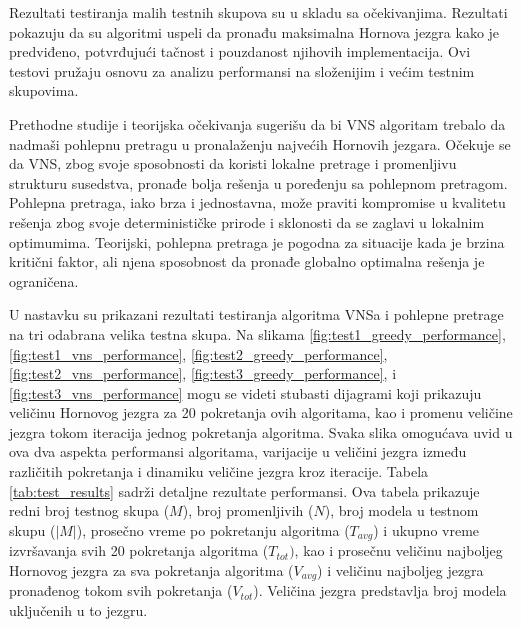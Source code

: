 \documentclass[12pt,oneside]{memoir}
\begin{document}
Rezultati testiranja malih testnih skupova su u skladu sa očekivanjima. Rezultati pokazuju da su algoritmi uspeli da pronađu maksimalna Hornova jezgra kako je predviđeno, potvrđujući tačnost i pouzdanost njihovih implementacija. Ovi testovi pružaju osnovu za analizu performansi na složenijim i većim testnim skupovima.

Prethodne studije i teorijska očekivanja sugerišu da bi VNS algoritam trebalo da nadmaši pohlepnu pretragu u pronalaženju najvećih Hornovih jezgara. Očekuje se da VNS, zbog svoje sposobnosti da koristi lokalne pretrage i promenljivu strukturu susedstva, pronađe bolja rešenja u poređenju sa pohlepnom pretragom. Pohlepna pretraga, iako brza i jednostavna, može praviti kompromise u kvalitetu rešenja zbog svoje determinističke prirode i sklonosti da se zaglavi u lokalnim optimumima. Teorijski, pohlepna pretraga je pogodna za situacije kada je brzina kritični faktor, ali njena sposobnost da pronađe globalno optimalna rešenja je ograničena.

U nastavku su prikazani rezultati testiranja algoritma VNSa i pohlepne pretrage na tri odabrana velika testna skupa. Na slikama \ref{fig:test1_greedy_performance}, \ref{fig:test1_vns_performance}, \ref{fig:test2_greedy_performance}, \ref{fig:test2_vns_performance}, \ref{fig:test3_greedy_performance}, i \ref{fig:test3_vns_performance} mogu se videti stubasti dijagrami koji prikazuju veličinu Hornovog jezgra za 20 pokretanja ovih algoritama, kao i promenu veličine jezgra tokom iteracija jednog pokretanja algoritma. Svaka slika omogućava uvid u ova dva aspekta performansi algoritama, varijacije u veličini jezgra između različitih pokretanja i dinamiku veličine jezgra kroz iteracije. Tabela \ref{tab:test_results} sadrži detaljne rezultate performansi. Ova tabela prikazuje redni broj testnog skupa ($M$), broj promenljivih ($N$), broj modela u testnom skupu ($|M|$), prosečno vreme po pokretanju algoritma ($T_{avg}$) i ukupno vreme izvršavanja svih 20 pokretanja algoritma ($T_{tot})$, kao i prosečnu veličinu najboljeg Hornovog jezgra za sva pokretanja algoritma ($V_{avg}$) i veličinu najboljeg jezgra pronađenog tokom svih pokretanja ($V_{tot}$). Veličina jezgra predstavlja broj modela uključenih u to jezgru.
\newpage
\end{document}
